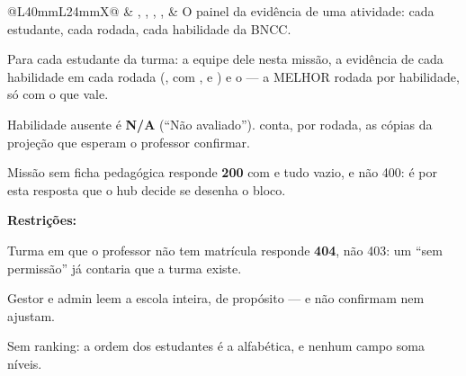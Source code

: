 \begin{tabularx}{\linewidth}{@{}L{40mm}L{24mm}X@{}}
 & , , , ,  & O painel da evidência de uma atividade: cada estudante, cada rodada, cada habilidade da BNCC.\par Para cada estudante da turma: a equipe dele nesta missão, a evidência de cada habilidade em cada rodada (, com ,  e ) e o  --- a MELHOR rodada por habilidade, só com o que vale.\par Habilidade ausente é \textbf{N/A} (\enquote{Não avaliado}).  conta, por rodada, as cópias da projeção que esperam o professor confirmar.\par Missão sem ficha pedagógica responde \textbf{200} com  e tudo vazio, e não 400: é por esta resposta que o hub decide se desenha o bloco.\par \textbf{Restrições:}\par \hspace*{1em}\textbullet{} Turma em que o professor não tem matrícula responde \textbf{404}, não 403: um \enquote{sem permissão} já contaria que a turma existe.\par \hspace*{1em}\textbullet{} Gestor e admin leem a escola inteira, de propósito --- e não confirmam nem ajustam.\par \hspace*{1em}\textbullet{} Sem ranking: a ordem dos estudantes é a alfabética, e nenhum campo soma níveis.\\

\end{tabularx}

